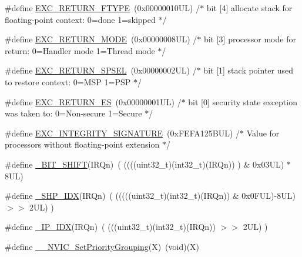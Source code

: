 \begin{DoxyCompactItemize}
\item 
\#define \hyperlink{group___c_m_s_i_s___core___n_v_i_c_functions_ga342b51c3eec59822bf206e24ef881a9e}{E\+X\+C\+\_\+\+R\+E\+T\+U\+R\+N\+\_\+\+F\+T\+Y\+PE}~(0x00000010\+U\+L)     /$\ast$ bit \mbox{[}4\mbox{]} allocate stack for floating-\/point context\+: 0=done 1=skipped  $\ast$/
\item 
\#define \hyperlink{group___c_m_s_i_s___core___n_v_i_c_functions_gabb65f847769a7807395b2739cc9702d0}{E\+X\+C\+\_\+\+R\+E\+T\+U\+R\+N\+\_\+\+M\+O\+DE}~(0x00000008\+U\+L)     /$\ast$ bit \mbox{[}3\mbox{]} processor mode for return\+: 0=\+Handler mode 1=\+Thread mode      $\ast$/
\item 
\#define \hyperlink{group___c_m_s_i_s___core___n_v_i_c_functions_ga686922b26c29eac540f53a6213627466}{E\+X\+C\+\_\+\+R\+E\+T\+U\+R\+N\+\_\+\+S\+P\+S\+EL}~(0x00000002\+U\+L)     /$\ast$ bit \mbox{[}1\mbox{]} stack pointer used to restore context\+: 0=\+M\+S\+P 1=\+P\+S\+P           $\ast$/
\item 
\#define \hyperlink{group___c_m_s_i_s___core___n_v_i_c_functions_gac939dbf69d3063c76a28516a4ae84db7}{E\+X\+C\+\_\+\+R\+E\+T\+U\+R\+N\+\_\+\+ES}~(0x00000001\+U\+L)     /$\ast$ bit \mbox{[}0\mbox{]} security state exception was taken to\+: 0=\+Non-\/secure 1=\+Secure $\ast$/
\item 
\#define \hyperlink{group___c_m_s_i_s___core___n_v_i_c_functions_ga7d1b21b2d863ccd9e23a3295b3173155}{E\+X\+C\+\_\+\+I\+N\+T\+E\+G\+R\+I\+T\+Y\+\_\+\+S\+I\+G\+N\+A\+T\+U\+RE}~(0x\+F\+E\+F\+A125\+B\+U\+L)     /$\ast$ Value for processors without floating-\/point extension                $\ast$/
\item 
\#define \hyperlink{group___c_m_s_i_s___core___n_v_i_c_functions_ga53c75b28823441c6153269f0ecbed878}{\+\_\+\+B\+I\+T\+\_\+\+S\+H\+I\+FT}(I\+R\+Qn)~(  ((((uint32\+\_\+t)(int32\+\_\+t)(I\+R\+Qn))         )      \&  0x03\+U\+L) $\ast$ 8\+U\+L)
\item 
\#define \hyperlink{group___c_m_s_i_s___core___n_v_i_c_functions_gaee4f7eb5d7e770ad51489dbceabb1755}{\+\_\+\+S\+H\+P\+\_\+\+I\+DX}(I\+R\+Qn)~( (((((uint32\+\_\+t)(int32\+\_\+t)(I\+R\+Qn)) \& 0x0\+F\+U\+L)-\/8\+U\+L) $>$$>$    2\+U\+L)      )
\item 
\#define \hyperlink{group___c_m_s_i_s___core___n_v_i_c_functions_ga370ec4b1751a6a889d849747df3763a9}{\+\_\+\+I\+P\+\_\+\+I\+DX}(I\+R\+Qn)~(   (((uint32\+\_\+t)(int32\+\_\+t)(I\+R\+Qn))                $>$$>$    2\+U\+L)      )
\item 
\#define \hyperlink{group___c_m_s_i_s___core___n_v_i_c_functions_ga6834dd8c9c59394f1b544b57665293a4}{\+\_\+\+\_\+\+N\+V\+I\+C\+\_\+\+Set\+Priority\+Grouping}(X)~(void)(X)

\end{DoxyCompactItemize}
